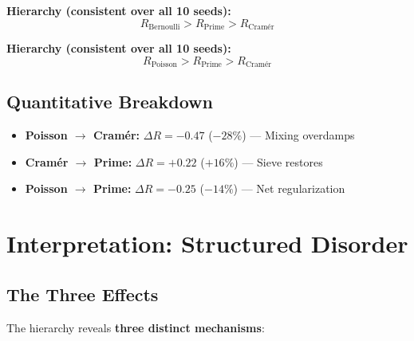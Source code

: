 \documentclass[11pt,a4paper]{article}
\theoremstyle{definition}
\theoremstyle{remark}
\begin{document}
\textbf{Hierarchy (consistent over all 10 seeds):}
\begin{equation}
\boxed{R_{\text{Bernoulli}} > R_{\text{Prime}} > R_{\text{Cramér}}}
\end{equation}

\textbf{Hierarchy (consistent over all 10 seeds):}
\begin{equation}
\boxed{R_{\text{Poisson}} > R_{\text{Prime}} > R_{\text{Cramér}}}
\end{equation}

\subsection{Quantitative Breakdown}

\begin{itemize}
\item \textbf{Poisson $\to$ Cramér:} $\Delta R = -0.47$ ($-28\%$) — Mixing overdamps
\item \textbf{Cramér $\to$ Prime:} $\Delta R = +0.22$ ($+16\%$) — Sieve restores
\item \textbf{Poisson $\to$ Prime:} $\Delta R = -0.25$ ($-14\%$) — Net regularization
\end{itemize}

\section{Interpretation: Structured Disorder}

\subsection{The Three Effects}

The hierarchy reveals \textbf{three distinct mechanisms}:
\end{document}
